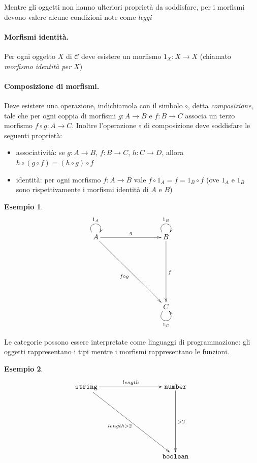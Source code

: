 \documentclass[12pt]{article}
\newtheorem{example}{Esempio}
\begin{document}
Mentre gli oggetti non hanno ulteriori proprietà da soddisfare, per i morfismi devono valere alcune condizioni note come \emph{leggi}\\

\paragraph{Morfismi identità.} Per ogni oggetto $X$ di $\mathcal{C}$ deve esistere un morfismo $1_X: X \rightarrow X$ (chiamato \emph{morfismo identità per $X$})\\

\paragraph{Composizione di morfismi.} Deve esistere una operazione, indichiamola con il simbolo $\circ$, detta \emph{composizione}, tale che per ogni coppia di morfismi $g: A \rightarrow B$
e $f: B \rightarrow C$ associa un terzo morfismo $f \circ g: A \rightarrow C$. Inoltre l'operazione $\circ$ di composizione deve soddisfare le seguenti proprietà:

\begin{itemize}
  \item associatività: se $g: A \rightarrow B$, $f: B \rightarrow C$, $h: C \rightarrow D$, allora $h \circ (g \circ f) = (h \circ g) \circ f$
  \item identità: per ogni morfismo $f: A \rightarrow B$ vale $f \circ 1_A = f = 1_B \circ f$ (ove $1_A$ e $1_B$ sono rispettivamente i morfismi identità di $A$ e $B$)
\end{itemize}

\begin{example}
\[
\xymatrixrowsep{3cm}
\xymatrixcolsep{3cm}
\xymatrix{
  A \ar@(ul,ur)^{1_A} \ar[r]^g \ar[rd]_{f \circ g} & B \ar@(ul,ur)^{1_B} \ar[d]^f \\
    & C \ar@(dl,dr)_{1_C}
}
\]
\end{example}

Le categorie possono essere interpretate come linguaggi di programmazione: gli oggetti rappresentano i tipi mentre i morfismi
rappresentano le funzioni.

\begin{example}
\[
\xymatrixrowsep{3cm}
\xymatrixcolsep{3cm}
\xymatrix{
  {\texttt{string}} \ar[r]^{length} \ar[rd]_{length > 2} & {\texttt{number}} \ar[d]^{> 2} \\
    & {\texttt{boolean}}
}
\]
\end{example}
\end{document}
